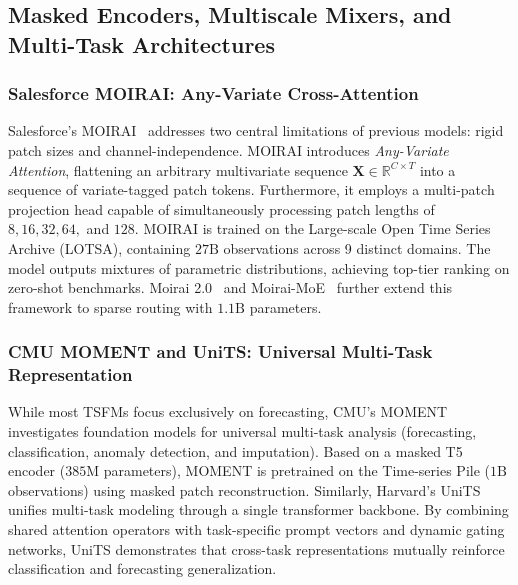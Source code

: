 \subsection{Masked Encoders, Multiscale Mixers, and Multi-Task Architectures}

\subsubsection{Salesforce MOIRAI: Any-Variate Cross-Attention}
Salesforce's MOIRAI~\cite{woo2024moirai} addresses two central limitations of previous models: rigid patch sizes and channel-independence. MOIRAI introduces \emph{Any-Variate Attention}, flattening an arbitrary multivariate sequence $\mathbf{X} \in \mathbb{R}^{C \times T}$ into a sequence of variate-tagged patch tokens. Furthermore, it employs a multi-patch projection head capable of simultaneously processing patch lengths of $8, 16, 32, 64,$ and $128$.
MOIRAI is trained on the Large-scale Open Time Series Archive (LOTSA), containing $27\text{B}$ observations across 9 distinct domains. The model outputs mixtures of parametric distributions, achieving top-tier ranking on zero-shot benchmarks. Moirai 2.0~\cite{woo2025moirai2} and Moirai-MoE~\cite{woo2024moiraimoe} further extend this framework to sparse routing with $1.1\text{B}$ parameters.

\subsubsection{CMU MOMENT and UniTS: Universal Multi-Task Representation}
While most TSFMs focus exclusively on forecasting, CMU's MOMENT~\cite{goswami2024moment} investigates foundation models for universal multi-task analysis (forecasting, classification, anomaly detection, and imputation). Based on a masked T5 encoder ($385\text{M}$ parameters), MOMENT is pretrained on the Time-series Pile ($1\text{B}$ observations) using masked patch reconstruction.
Similarly, Harvard's UniTS~\cite{zhou2024units} unifies multi-task modeling through a single transformer backbone. By combining shared attention operators with task-specific prompt vectors and dynamic gating networks, UniTS demonstrates that cross-task representations mutually reinforce classification and forecasting generalization.

